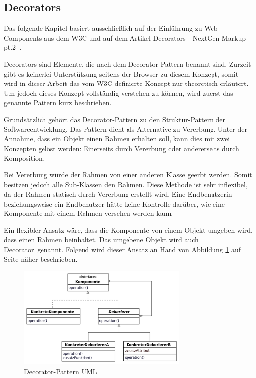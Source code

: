 \subsection{Decorators}
\label{sec:3_WC_Decorators}

Das folgende Kapitel basiert ausschließlich auf der Einführung zu Web-Components aus dem W3C \citereset \autocite[siehe][]{CooneyGlazkov.2013} und auf dem Artikel \glqq Decorators - NextGen Markup pt.2\grqq\ \citereset \autocite[siehe][]{PreventDefault.2013}.

Decorators sind Elemente, die nach dem Decorator-Pattern benannt sind. Zurzeit gibt es keinerlei Unterstützung seitens der Browser zu diesem Konzept, somit wird in dieser Arbeit das vom W3C definierte Konzept nur theoretisch erläutert. Um jedoch dieses Konzept vollständig verstehen zu können, wird zuerst das genannte Pattern kurz beschrieben.

Grundsätzlich gehört das Decorator-Pattern zu den Struktur-Pattern der Softwareentwicklung. Das Pattern dient als Alternative zu Vererbung. Unter der Annahme, dass ein Objekt einen Rahmen erhalten soll, kann dies mit zwei Konzepten gelöst werden: Einerseits durch Vererbung oder andererseits durch Komposition.

Bei Vererbung würde der Rahmen von einer anderen Klasse geerbt werden. Somit besitzen jedoch alle Sub-Klassen den Rahmen. Diese Methode ist sehr inflexibel, da der Rahmen statisch durch Vererbung erstellt wird. Eine Endbenutzerin beziehungsweise ein Endbenutzer hätte keine Kontrolle darüber, wie eine Komponente mit einem Rahmen versehen werden kann.

Ein flexibler Ansatz wäre, dass die Komponente von einem Objekt umgeben wird, dass einen Rahmen beinhaltet. Das umgebene Objekt wird auch \glqq Decorator\grqq\ genannt. Folgend wird dieser Ansatz an Hand von Abbildung \ref{fig:3_Decorator_UML} auf Seite \pageref{fig:3_Decorator_UML} näher beschrieben.

\begin{figure}[h]
\centering
\includegraphics[height=5.0cm]{images/decorator.png}
\caption[
Decorator-Pattern UML
]{Decorator-Pattern UML \citereset \autocite[siehe][S. 196-200]{Gamma.1995}}
\label{fig:3_Decorator_UML}
\end{figure}

